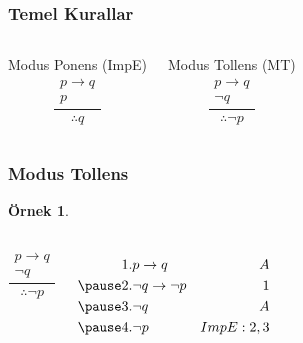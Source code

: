 \documentclass[dvipsnames]{beamer}
\theoremstyle{definition}
\theoremstyle{example}
\newtheorem{ornek}[theorem]{Örnek}
\theoremstyle{plain}
\begin{document}
\begin{frame}
  \frametitle{Temel Kurallar}

  \begin{columns}[t]
    \begin{block}{Modus Ponens (ImpE)}
      \[
      \frac
        {
          \begin{array}{c}
            p \rightarrow q\\
            p
          \end{array}
        }
        {
          \therefore q
        }
      \]
    \end{block}

    \pause
    \begin{block}{Modus Tollens (MT)}
      \[
      \frac
        {
          \begin{array}{c}
            p \rightarrow q\\
            \neg q
          \end{array}
        }
        {
          \therefore \neg p
        }
      \]
    \end{block}
  \end{columns}
\end{frame}

\begin{frame}
  \frametitle{Modus Tollens}

  \begin{ornek}
    \begin{columns}
      \[
      \frac
        {
          \begin{array}{c}
            p \rightarrow q\\
            \neg q
          \end{array}
        }
        {
          \therefore \neg p
        }
      \]

      \pause
      \begin{eqnarray*}
        1. & p \rightarrow q           & A\\
        \pause
        2. & \neg q \rightarrow \neg p & 1\\
        \pause
        3. & \neg q                    & A\\
        \pause
        4. & \neg p                    & ImpE:2,3\\
      \end{eqnarray*}
    \end{columns}
  \end{ornek}
\end{frame}
\end{document}
